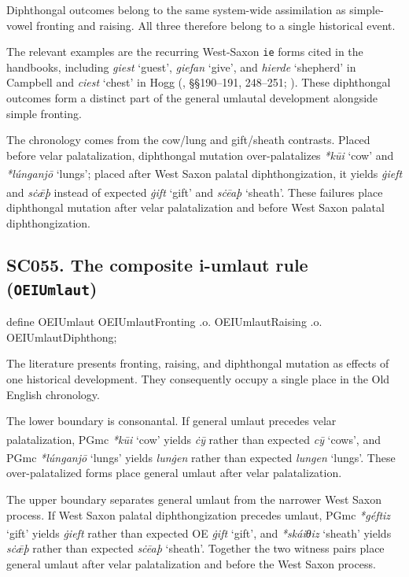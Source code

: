 \documentclass[
  british,
  a4paper,
  openany]{book}
\providecommand{\Pred}[1]{\textsuperscript{\dag}\emph{#1}}
\providecommand{\Recon}[1]{\emph{*#1}}
{\catcode`→=\active \global\def→{\ensuremath{\rightarrow}}}
\providecommand{\texorpdfstring}[2]{#1}
\providecommand{\Pred}[1]{\textsuperscript{\dag}\emph{#1}}
\providecommand{\Recon}[1]{\emph{*#1}}
{\catcode`→=\active \global\def→{\ensuremath{\rightarrow}}}
\begin{document}
Diphthongal outcomes belong to the same system-wide assimilation as
simple-vowel fronting and raising. All three therefore belong to a
single historical event.

The relevant examples are the recurring West-Saxon \texttt{ie} forms
cited in the handbooks, including \emph{giest} `guest', \emph{giefan}
`give', and \emph{hierde} `shepherd' in Campbell and \emph{ciest}
`chest' in Hogg (, §§190--191, 248--251; ). These diphthongal outcomes form a distinct part of the
general umlautal development alongside simple fronting.

The chronology comes from the cow/lung and gift/sheath contrasts. Placed
before velar palatalization, diphthongal mutation over-palatalizes
\Recon{kūi} `cow' and \Recon{lúnganjō} `lungs'; placed after West Saxon
palatal diphthongization, it yields \Pred{ġieft} and \Pred{sċǣþ} instead
of expected \emph{ġift} `gift' and \emph{sċēaþ} `sheath'. These failures
place diphthongal mutation after velar palatalization and before West
Saxon palatal diphthongization.

\subsection{\texorpdfstring{SC055. The composite i-umlaut rule
(\texttt{OEIUmlaut})}{SC055. The composite i-umlaut rule (OEIUmlaut)}}\label{rule-OEIUmlaut}

\begin{ReaderFacingFoma}
define OEIUmlaut OEIUmlautFronting
    .o. OEIUmlautRaising
    .o. OEIUmlautDiphthong;
\end{ReaderFacingFoma}

The literature presents fronting, raising, and diphthongal mutation as
effects of one historical development. They consequently occupy a single
place in the Old English chronology.

The lower boundary is consonantal. If general umlaut precedes velar
palatalization, PGmc \Recon{kūi} `cow' yields \Pred{ċȳ} rather than
expected \emph{cȳ} `cows', and PGmc \Recon{lúnganjō} `lungs' yields
\Pred{lunġen} rather than expected \emph{lungen} `lungs'. These
over-palatalized forms place general umlaut after velar palatalization.

The upper boundary separates general umlaut from the narrower West Saxon
process. If West Saxon palatal diphthongization precedes umlaut, PGmc
\Recon{géftiz} `gift' yields \Pred{ġieft} rather than expected OE
\emph{ġift} `gift', and \Recon{skáiθiz} `sheath' yields \Pred{sċǣþ}
rather than expected \emph{sċēaþ} `sheath'. Together the two witness
pairs place general umlaut after velar palatalization and before the
West Saxon process.
\end{document}
